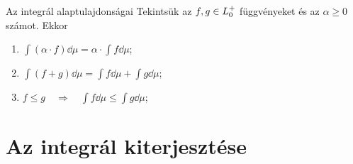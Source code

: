 \documentclass[
]{elteikthesis}[2024/04/26]
\begin{document}
	\begin{theorem}{Az integrál alaptulajdonságai}{}
		Tekintsük az \( f, g \in \StepFuncPos \) függvényeket és az \( \alpha \geq 0 \) számot. 
		Ekkor
		\begin{enumerate}
			\item \( \displaystyle \int (\alpha \cdot f) \dd{\mu} = \alpha \cdot \int f \dd{\mu} \);
			\item \( \displaystyle \int (f + g) \dd{\mu} = \int f \dd{\mu} + \int g \dd{\mu} \);
			\item \( \displaystyle f \leq g \quad \Longrightarrow \quad \int f \dd{\mu} \leq \int g \dd{\mu} \);
		\end{enumerate}
	\end{theorem}
	
	\newpage
	\section{Az integrál kiterjesztése}
	
\end{document}
